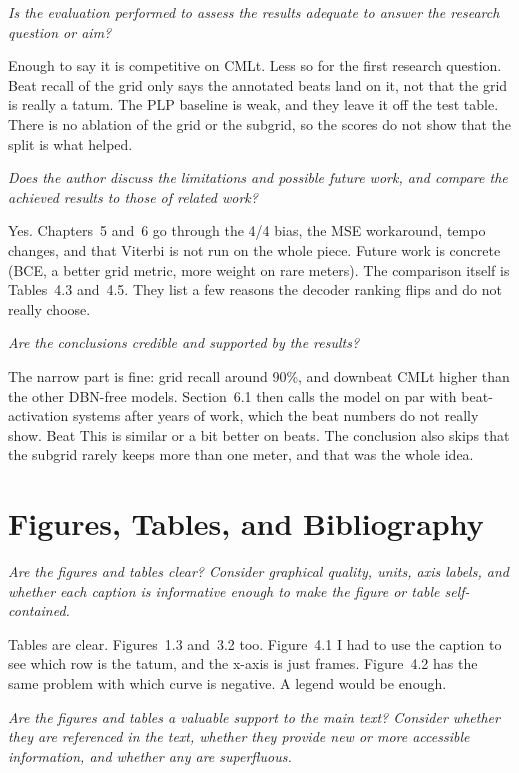 \documentclass[11pt,a4paper]{article}
\newcommand{\prompt}[1]{%
  \par\medskip
  \noindent\textit{#1}%
  \par\smallskip
}
\begin{document}
\prompt{Is the evaluation performed to assess the results adequate to answer the research question or aim?}

Enough to say it is competitive on CMLt. Less so for the first research question. Beat recall of the grid only says the annotated beats land on it, not that the grid is really a tatum. The PLP baseline is weak, and they leave it off the test table. There is no ablation of the grid or the subgrid, so the scores do not show that the split is what helped.

\prompt{Does the author discuss the limitations and possible future work, and compare the achieved results to those of related work?}

Yes. Chapters~5 and~6 go through the 4/4 bias, the MSE workaround, tempo changes, and that Viterbi is not run on the whole piece. Future work is concrete (BCE, a better grid metric, more weight on rare meters). The comparison itself is Tables~4.3 and~4.5. They list a few reasons the decoder ranking flips and do not really choose.

\prompt{Are the conclusions credible and supported by the results?}

The narrow part is fine: grid recall around 90\%, and downbeat CMLt higher than the other DBN-free models. Section~6.1 then calls the model on par with beat-activation systems after years of work, which the beat numbers do not really show. Beat This is similar or a bit better on beats. The conclusion also skips that the subgrid rarely keeps more than one meter, and that was the whole idea.

\section{Figures, Tables, and Bibliography}

\prompt{Are the figures and tables clear? Consider graphical quality, units, axis labels, and whether each caption is informative enough to make the figure or table self-contained.}

Tables are clear. Figures~1.3 and~3.2 too. Figure~4.1 I had to use the caption to see which row is the tatum, and the x-axis is just frames. Figure~4.2 has the same problem with which curve is negative. A legend would be enough.

\prompt{Are the figures and tables a valuable support to the main text? Consider whether they are referenced in the text, whether they provide new or more accessible information, and whether any are superfluous.}
\end{document}

